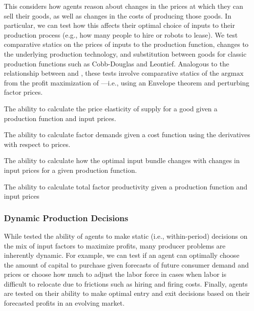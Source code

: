 This \child considers how agents reason about changes in the prices at which they can sell their goods, as well as changes in the costs of producing those goods.  In particular, we can test how this affects their optimal choice of inputs to their production process (e.g., how many people to hire or robots to lease). We test comparative statics on the prices of inputs to the production function, changes to the underlying production technology, and substitution between goods for classic production functions such as Cobb-Douglas and Leontief.  Analogous to the relationship between  and , these tests involve comparative statics of the $\mathrm{argmax}$ from the profit maximization of ---i.e., using an Envelope theorem and perturbing factor prices.

\begin{el} 
{The ability to calculate the price elasticity of supply for a good given a production function and input prices.}
\end{el}

\begin{el}
    {The ability to calculate factor demands given a cost function using the derivatives with respect to prices.}
\end{el}

\begin{el}
    {The ability to calculate how the optimal input bundle changes with changes in input prices for a given production function.}
\end{el}

\begin{el}
    {The ability to calculate total factor productivity given a production function and input prices}
\end{el}


\subsubsection{Dynamic Production Decisions}\label{mod:dynamic_production}
While  tested the ability of agents to make static (i.e., within-period) decisions on the mix of input factors to maximize profits, many producer problems are inherently dynamic.  For example, we can test if an agent can optimally choose the amount of capital to purchase given forecasts of future consumer demand and prices or choose how much to adjust the labor force in cases when labor is difficult to relocate due to frictions such as hiring and firing costs.  Finally, agents are tested on their ability to make optimal entry and exit decisions based on their forecasted profits in an evolving market.


